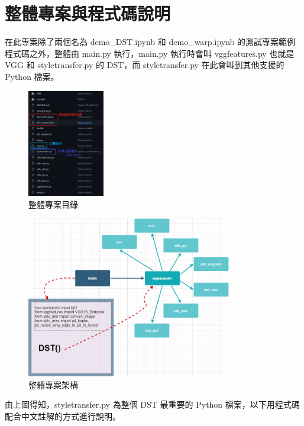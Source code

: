 \documentclass[10pt,UTF8]{ctexart}
\begin{document}
\newpage

\section{整體專案與程式碼說明}

在此專案除了兩個名為 demo\_DST.ipynb 和 demo\_warp.ipynb 的測試專案範例程式碼之外，整體由 main.py 執行，main,py 執行時會叫 vggfeatures.py 也就是 VGG 和 styletransfer.py 的 DST，而 styletransfer.py 在此會叫到其他支援的 Python 檔案。

\begin{figure}[H]
\centering 
\includegraphics[width=0.30\textwidth]{p1.png} 
\caption{整體專案目錄}
\label{Test}
\end{figure}

\begin{figure}[H]
\centering 
\includegraphics[width=0.80\textwidth]{p2.png} 
\caption{整體專案架構}
\label{Test}
\end{figure}

\newpage

由上圖得知，styletransfer.py 為整個 DST 最重要的 Python 檔案，以下用程式碼配合中文註解的方式進行說明。
\end{document}
